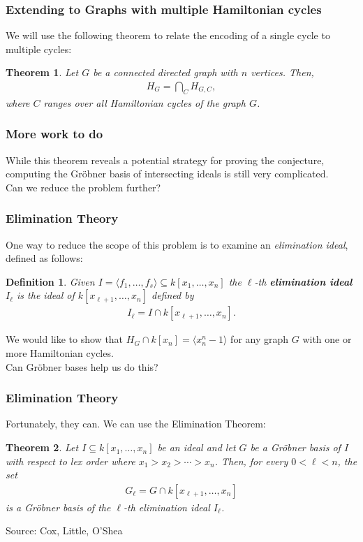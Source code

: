 \documentclass{beamer}
\newtheorem{defin}{Definition}
\newtheorem{thm}{Theorem}
\begin{document}
\begin{frame}
\frametitle{Extending to Graphs with multiple Hamiltonian cycles}
We will use the following theorem to relate the encoding of a single cycle to multiple cycles:
\begin{thm}
Let $G$ be a connected directed graph with $n$ vertices. Then,
\begin{align*}
	H_G = \bigcap_C H_{G,C},
\end{align*}
where $C$ ranges over all Hamiltonian cycles of the graph $G$.
\end{thm}
\end{frame}

\begin{frame}
\frametitle{More work to do}
While this theorem reveals a potential strategy for proving the conjecture, computing the Gr\"obner basis of intersecting ideals is still very complicated.\\
\vfill
Can we reduce the problem further?
\end{frame}

\begin{frame}
\frametitle{Elimination Theory}
One way to reduce the scope of this problem is to examine an \emph{elimination ideal}, defined as follows:
\begin{defin}
Given $I = \langle f_1, \ldots, f_s \rangle \subseteq k[x_1, \ldots, x_n]$ the $\ell$-th \textbf{elimination ideal} $I_\ell$ is the ideal of $k[x_{\ell+1}, \ldots, x_n]$ defined by
\begin{align*}
	I_\ell = I \cap k[x_{\ell+1}, \ldots, x_n].
\end{align*}
\end{defin}
We would like to show that $H_G \cap k[x_n] = \langle x_n^n - 1 \rangle$ for any graph $G$ with one or more Hamiltonian cycles.\\
Can Gr\"obner bases help us do this?
\end{frame}

\begin{frame}
\frametitle{Elimination Theory}
Fortunately, they can. We can use the Elimination Theorem:
\begin{thm}
Let $I \subseteq k[x_1, \ldots, x_n]$ be an ideal and let $G$ be a Gr\"obner basis of $I$ with respect to lex order where $x_1 > x_2 > \cdots > x_n$. Then, for every $0 < \ell < n$, the set
\begin{align*}
	G_\ell = G \cap k[x_{\ell+1}, \ldots, x_n]
\end{align*}
is a Gr\"obner basis of the $\ell$-th elimination ideal $I_\ell$.
\end{thm}
Source: Cox, Little, O'Shea
\end{frame}
\end{document}
